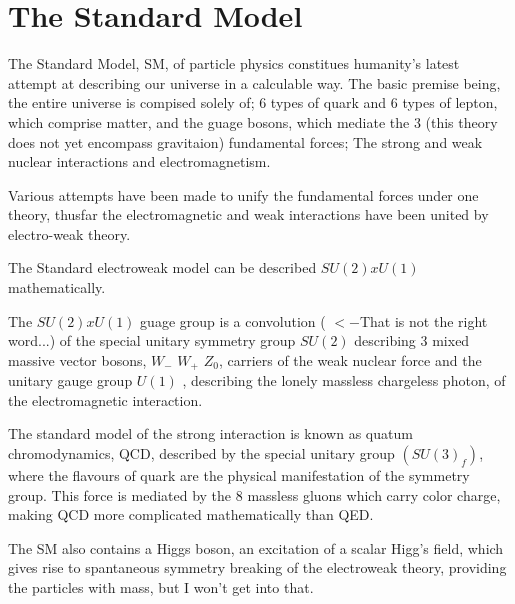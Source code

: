 \section{The Standard Model}\label{secSM:ch1}

The Standard Model, SM, of particle physics constitues humanity's latest attempt at describing our universe in a calculable way. The basic premise being, the entire universe is compised solely of; 6 types of quark and 6 types of lepton, which comprise matter, and the guage bosons, which mediate the 3 (this theory does not yet encompass gravitaion) fundamental forces; The strong and weak nuclear interactions and electromagnetism. 


Various attempts have been made to unify the fundamental forces under one theory, thusfar the electromagnetic and weak interactions have been united by electro-weak theory. 

The Standard electroweak model can be described $SU(2) x U(1)$ mathematically.

The  $SU(2) x U(1)$ guage group is a convolution ( $<- $That is not the right word...) of the special unitary symmetry group $SU(2)$ describing 3 mixed massive vector bosons, $W_{-}$ $W_{+}$ $Z_0$, carriers of the weak nuclear force and the unitary gauge group $U(1)$ , describing the lonely massless chargeless photon, of the electromagnetic interaction.

The standard model of the strong interaction is known as quatum chromodynamics, QCD, described by the special unitary group $(SU(3)_f)$, where the  flavours of quark are the physical manifestation of the symmetry group. This force is mediated by the 8 massless gluons which carry color charge, making QCD more complicated mathematically than QED.

The SM also contains a Higgs boson, an excitation of a scalar Higg's field, which gives rise to spantaneous symmetry breaking of the electroweak theory, providing the particles with mass, but I won't get into that. 

